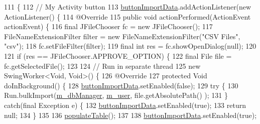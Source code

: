 \begin{DoxyCode}
111                                         \{
112         \textcolor{comment}{// My Activity button}
113         \mbox{\hyperlink{classcom_1_1activitytracker_1_1_main_window_a2e469a48de58cf91979d95148972379b}{buttonImportData}}.addActionListener(\textcolor{keyword}{new} ActionListener() \{
114             @Override
115             \textcolor{keyword}{public} \textcolor{keywordtype}{void} actionPerformed(ActionEvent actionEvent) \{
116                 \textcolor{keyword}{final} JFileChooser fc = \textcolor{keyword}{new} JFileChooser();
117                 FileNameExtensionFilter filter = \textcolor{keyword}{new} FileNameExtensionFilter(\textcolor{stringliteral}{"CSV Files"}, \textcolor{stringliteral}{"csv"});
118                 fc.setFileFilter(filter);
119                 \textcolor{keyword}{final} \textcolor{keywordtype}{int} res = fc.showOpenDialog(null);
120 
121                 \textcolor{keywordflow}{if} (res == JFileChooser.APPROVE\_OPTION) \{
122                     \textcolor{keyword}{final} File file = fc.getSelectedFile();
123 
124                     \textcolor{comment}{// Run in separate thread}
125                     \textcolor{keyword}{new} SwingWorker<Void, Void>() \{
126                         @Override
127                         \textcolor{keyword}{protected} Void doInBackground() \{
128                             \mbox{\hyperlink{classcom_1_1activitytracker_1_1_main_window_a2e469a48de58cf91979d95148972379b}{buttonImportData}}.setEnabled(\textcolor{keyword}{false});
129                             \textcolor{keywordflow}{try} \{
130                                 Run.bulkImport(\mbox{\hyperlink{classcom_1_1activitytracker_1_1_main_window_ab2af51cb35794567e55564a4d3abbb79}{m\_dbManager}}, \mbox{\hyperlink{classcom_1_1activitytracker_1_1_main_window_a96e28fa47e1740a7ddc16aa48406db85}{m\_user}}, file.getAbsolutePath()
      );
131                             \} \textcolor{keywordflow}{catch}(\textcolor{keyword}{final} Exception e) \{
132                                 \mbox{\hyperlink{classcom_1_1activitytracker_1_1_main_window_a2e469a48de58cf91979d95148972379b}{buttonImportData}}.setEnabled(\textcolor{keyword}{true});
133                                 \textcolor{keywordflow}{return} null;
134                             \}
135 
136                             \mbox{\hyperlink{classcom_1_1activitytracker_1_1_main_window_ae3955dd50087d95257d029b9c67ac185}{populateTable}}();
137 
138                             \mbox{\hyperlink{classcom_1_1activitytracker_1_1_main_window_a2e469a48de58cf91979d95148972379b}{buttonImportData}}.setEnabled(\textcolor{keyword}{true});

\end{DoxyCode}

